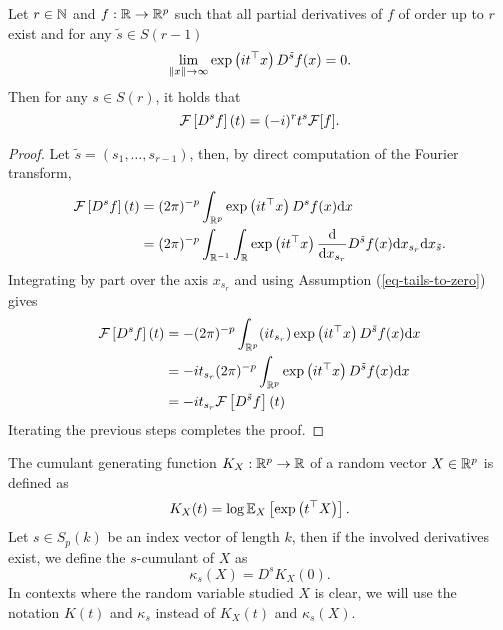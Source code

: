 \begin{lemma} \label{lemma-fourier-derivative}
    Let $r \in \N$ and $f : \R \rightarrow \Rp$ such that all partial derivatives of $f$ of order up to $r$ exist and for any $\tilde{s} \in S(r-1)$
    \begin{equation} \label{eq-tails-to-zero}
        \lim_{\norm{x} \rightarrow \infty} \expf{it^\top x}D^{\tilde{s}}f(x) = 0.
    \end{equation}
    Then for any $s \in S(r)$, it holds that
    \begin{equation*}
        \F\left[D^s f \right](t) = (-i)^r t^s \F[f].
    \end{equation*}
\end{lemma}
\begin{proof}
    Let $\tilde{s} = (s_1, \ldots, s_{r-1})$, then, by direct computation of the Fourier transform,
    \begin{align*}
        \F\left[D^s f \right](t) 
        &= (2\pi)^{-p}\intRp{x}{ \expf{it^\top x} D^s f(x) } \\
        &= (2\pi)^{-p}\int_{\R^{-1}} \int_\R 
            \expf{it^\top x} \ddx{x_{s_r}} D^{\tilde{s}} f(x) 
        \d x_{s_r} \d x_{\tilde{s}}.
    \end{align*}
    Integrating by part over the axis $x_{s_r}$ and using Assumption (\ref{eq-tails-to-zero}) gives
    \begin{align*}
        \F\left[D^s f \right](t)  
        &= - (2\pi)^{-p}\intRp{x}{
            (it_{s_r})\expf{it^\top x} D^{\tilde{s}} f(x)
        } \\
        &= -it_{s_r} (2\pi)^{-p}\intRp{x}{
            \expf{it^\top x} D^{\tilde{s}} f(x)
        } \\
        &= -it_{s_r} \F\left[D^{\tilde{s}} f \right](t)
    \end{align*}
    Iterating the previous steps completes the proof.
\end{proof}


\begin{definition}
    The cumulant generating function $K_X : \Rp \rightarrow \R$ of a random vector $X \in \Rp$ is defined as 
    \begin{equation*}
        K_X(t) = \log \expec{X}{\expf{t^\top X}}.
    \end{equation*}
    Let $s \in S_p(k)$ be an index vector of length $k$, then if the involved derivatives exist, we define the $s$-cumulant of $X$ as
    \begin{equation*}
        \kappa_s(X) = D^s K_X(0).
    \end{equation*}
    In contexts where the random variable studied $X$ is clear, we will use the notation $K(t)$ and $\kappa_s$ instead of $K_X(t)$ and $\kappa_s(X)$.
\end{definition}

